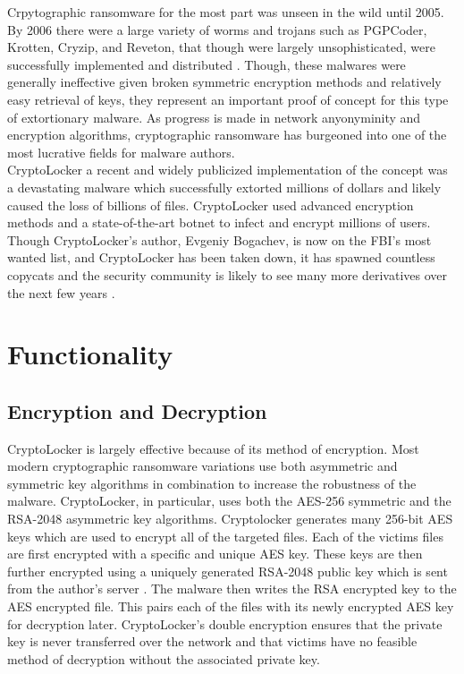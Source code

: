 \documentclass[11.5pt]{article}
\begin{document}
\indent Crpytographic ransomware for the most part was unseen in the wild until 2005.  By 2006 there were a large variety of worms and trojans such as PGPCoder, Krotten, Cryzip, and Reveton, that though were largely unsophisticated, were successfully implemented and distributed \cite{blackhat}.  Though, these malwares were generally ineffective given broken symmetric encryption methods and relatively easy retrieval of keys, they represent an important proof of concept for this type of extortionary malware.  As progress is made in network anyonyminity and encryption algorithms, cryptographic ransomware has burgeoned into one of the most lucrative fields for malware authors. \\

\indent CryptoLocker a recent and widely publicized implementation of the concept was a devastating malware which successfully extorted millions of dollars and likely caused the loss of billions of files.  CryptoLocker used advanced encryption methods and a state-of-the-art botnet to infect and encrypt millions of users.  Though CryptoLocker's author, Evgeniy Bogachev, is now on the FBI's most wanted list, and CryptoLocker has been taken down, it has spawned countless copycats and the security community is likely to see many more derivatives over the next few years \cite{fbi}.  

\section{Functionality}

\subsection{Encryption and Decryption}
CryptoLocker is largely effective because of its method of encryption.  Most modern cryptographic ransomware variations use both asymmetric and symmetric key algorithms in combination to increase the robustness of the malware. CryptoLocker, in particular, uses both the AES-256 symmetric and the RSA-2048 asymmetric key algorithms. Cryptolocker generates many 256-bit AES keys which are used to encrypt all of the targeted files.  Each of the victims files are first encrypted with a specific and unique AES key.  These keys are then further encrypted using a uniquely generated RSA-2048 public key which is sent from the author's server \cite{emisoft}.  The malware then writes the RSA encrypted key to the AES encrypted file. This pairs each of the files with its newly encrypted AES key for decryption later.  CryptoLocker's double encryption ensures that the private key is never transferred over the network and that victims have no feasible method of decryption without the associated private key.  \\
\end{document}

